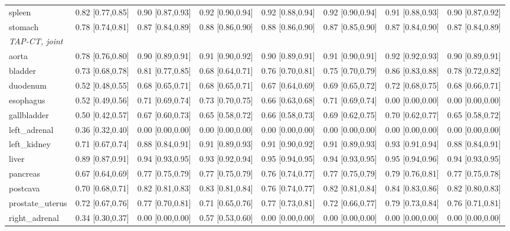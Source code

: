 \begin{tabular}{lccccccc}
spleen & 0.82 [0.77,0.85] & 0.90 [0.87,0.93] & 0.92 [0.90,0.94] & 0.92 [0.88,0.94] & 0.92 [0.90,0.94] & 0.91 [0.88,0.93] & 0.90 [0.87,0.92] \\
stomach & 0.78 [0.74,0.81] & 0.87 [0.84,0.89] & 0.88 [0.86,0.90] & 0.88 [0.86,0.90] & 0.87 [0.85,0.90] & 0.87 [0.84,0.90] & 0.87 [0.84,0.89] \\
\multicolumn{8}{l}{\textit{TAP-CT, joint}} \\
aorta & 0.78 [0.76,0.80] & 0.90 [0.89,0.91] & 0.91 [0.90,0.92] & 0.90 [0.89,0.91] & 0.91 [0.90,0.91] & 0.92 [0.92,0.93] & 0.90 [0.89,0.91] \\
bladder & 0.73 [0.68,0.78] & 0.81 [0.77,0.85] & 0.68 [0.64,0.71] & 0.76 [0.70,0.81] & 0.75 [0.70,0.79] & 0.86 [0.83,0.88] & 0.78 [0.72,0.82] \\
duodenum & 0.52 [0.48,0.55] & 0.68 [0.65,0.71] & 0.68 [0.65,0.71] & 0.67 [0.64,0.69] & 0.69 [0.65,0.72] & 0.72 [0.68,0.75] & 0.68 [0.66,0.71] \\
esophagus & 0.52 [0.49,0.56] & 0.71 [0.69,0.74] & 0.73 [0.70,0.75] & 0.66 [0.63,0.68] & 0.71 [0.69,0.74] & 0.00 [0.00,0.00] & 0.00 [0.00,0.00] \\
gallbladder & 0.50 [0.42,0.57] & 0.67 [0.60,0.73] & 0.65 [0.58,0.72] & 0.66 [0.58,0.73] & 0.69 [0.62,0.75] & 0.70 [0.62,0.77] & 0.65 [0.58,0.72] \\
left\_adrenal & 0.36 [0.32,0.40] & 0.00 [0.00,0.00] & 0.00 [0.00,0.00] & 0.00 [0.00,0.00] & 0.00 [0.00,0.00] & 0.00 [0.00,0.00] & 0.00 [0.00,0.00] \\
left\_kidney & 0.71 [0.67,0.74] & 0.88 [0.84,0.91] & 0.91 [0.89,0.93] & 0.91 [0.90,0.92] & 0.91 [0.89,0.93] & 0.93 [0.91,0.94] & 0.88 [0.84,0.91] \\
liver & 0.89 [0.87,0.91] & 0.94 [0.93,0.95] & 0.93 [0.92,0.94] & 0.95 [0.94,0.95] & 0.94 [0.93,0.95] & 0.95 [0.94,0.96] & 0.94 [0.93,0.95] \\
pancreas & 0.67 [0.64,0.69] & 0.77 [0.75,0.79] & 0.77 [0.75,0.79] & 0.76 [0.74,0.77] & 0.77 [0.75,0.79] & 0.79 [0.76,0.81] & 0.77 [0.75,0.78] \\
postcava & 0.70 [0.68,0.71] & 0.82 [0.81,0.83] & 0.83 [0.81,0.84] & 0.76 [0.74,0.77] & 0.82 [0.81,0.84] & 0.84 [0.83,0.86] & 0.82 [0.80,0.83] \\
prostate\_uterus & 0.72 [0.67,0.76] & 0.77 [0.70,0.81] & 0.71 [0.65,0.76] & 0.77 [0.73,0.81] & 0.72 [0.66,0.77] & 0.79 [0.73,0.84] & 0.76 [0.71,0.81] \\
right\_adrenal & 0.34 [0.30,0.37] & 0.00 [0.00,0.00] & 0.57 [0.53,0.60] & 0.00 [0.00,0.00] & 0.00 [0.00,0.00] & 0.00 [0.00,0.00] & 0.00 [0.00,0.00] \\

\end{tabular}
